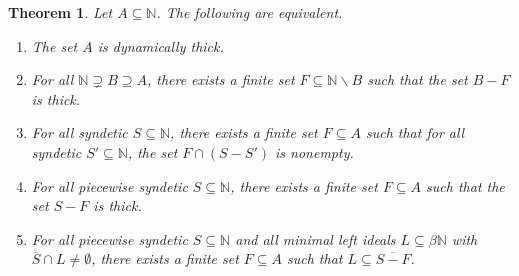 \documentclass[letter,11pt]{article}
\theoremstyle{plain}
\newtheorem{theorem}{Theorem}
\theoremstyle{definition}
\theoremstyle{plain}
\theoremstyle{plain}
\numberwithin{equation}{section}
\newcommand{\N}{\mathbb{N}}
\renewcommand{\setminus}{\backslash}
\begin{document}
\begin{theorem}
\label{lemma_our_fav_dy_thick}
    Let $A \subseteq \N$.  The following are equivalent.
    \begin{enumerate}
        \item 
        \label{item_dthick_def}
        The set $A$ is dynamically thick.

        \item 
        \label{item:dyn_thick_idempotent}
        For all $\N \supsetneq B \supseteq A$, there exists a finite set $F \subseteq \N \setminus B$ such that the set $B-F$ is thick.

        \item \label{item_condition_one}
        For all syndetic $S \subseteq \N$, there exists a finite set $F \subseteq A$ such that for all syndetic $S' \subseteq \N$, the set $F \cap (S - S')$ is nonempty.

        \item \label{item:complement_thick_dt_characterization_v2}
        For all piecewise syndetic $S \subseteq \N$, there exists a finite set $F \subseteq A$ such that the set $S-F$ is thick.

        \item
        \label{item:complement_psstar_dt_characterization_star_fixed}
        For all piecewise syndetic $S \subseteq \N$ and all minimal left ideals $L \subseteq \beta \N$ with $\overline{S} \cap L \neq \emptyset$, there exists a finite set $F \subseteq A$ such that $L \subseteq \overline{S-F}$.
    \end{enumerate}
\end{theorem}
\end{document}
